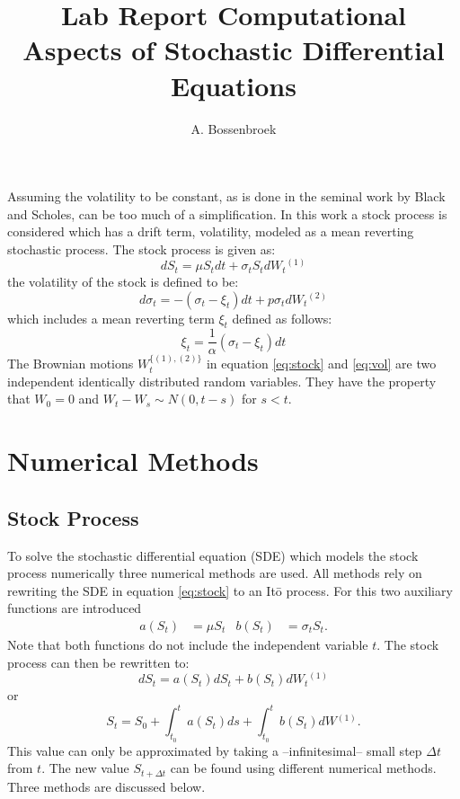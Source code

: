 \documentclass[a4paper,onecolumn,draft]{IEEEtran}
\author{A. Bossenbroek}
\title{Lab Report Computational Aspects of Stochastic Differential Equations}
\begin{document}
\maketitle
Assuming the volatility to be constant, as is done in the seminal work by Black
and Scholes, can be too much of a simplification. In this work a stock process
is considered which has a drift term, volatility, modeled as a mean reverting
stochastic process. The stock process is given as:
\newcommand{\indst}{\ensuremath{^{(1)}}}
\newcommand{\indvl}{\ensuremath{^{(2)}}}
\begin{equation}\label{eq:stock}
dS_t = \mu S_t dt + \sigma_t S_t dW_t\indst
\end{equation}
the volatility of the stock is defined to be:
\begin{equation}\label{eq:vol}
d\sigma_t = -(\sigma_t - \xi_t)dt + p\sigma_t dW_t\indvl
\end{equation}
which includes a mean reverting term $\xi_t$ defined as follows:
\begin{equation}\label{eq:mnrvrt}
\xi_t = \frac{1}{\alpha}(\sigma_t - \xi_t)dt
\end{equation}
The Brownian motions $W_t^{\{(1), (2)\}}$ in  equation \eqref{eq:stock} and
\eqref{eq:vol} are two independent identically distributed random variables.
They have the property that $W_0=0$ and $W_t - W_s \sim N(0, t - s)$ for $s <
t$.

\section{Numerical Methods}
\subsection{Stock Process}
To solve the stochastic differential equation (SDE) which models the stock 
process numerically three numerical methods are used. All methods rely on
rewriting the SDE in equation \eqref{eq:stock} to an It\=o process. For this two
auxiliary functions are introduced 
\begin{align}\label{eq:abstck}
a(S_t)&=\mu S_t&b(S_t)&=\sigma_t S_t.
\end{align}
Note that both functions do not include the independent variable $t$.  The
stock process can then be rewritten to:
\newcommand{\inttim}{\ensuremath{\int_{t_0}^{t}}}
\newcommand{\intdel}{\ensuremath{\int_{t}^{t + \Delta t}}}
\begin{equation*}
dS_t = a(S_t)dS_t + b(S_t)dW_t\indst
\end{equation*}
or
\begin{equation*}
S_t = S_0 + \inttim a(S_t)ds + \inttim b(S_t)dW\indst.
\end{equation*}
This value can only be approximated by taking a --infinitesimal-- small step
$\Delta t$ from $t$. The new value $S_{t + \Delta t}$ can be found using
different numerical methods. Three methods are discussed below.
\end{document}
